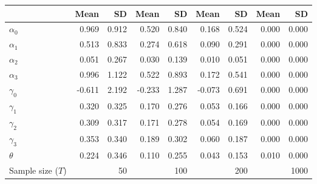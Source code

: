 
\begin{tabular}[t]{lrrrrrrrr}
\toprule
  & Mean & SD & Mean  & SD  & Mean   & SD   & Mean    & SD   \\
\midrule
$\alpha_{0}$ & 0.969 & 0.912 & 0.520 & 0.840 & 0.168 & 0.524 & 0.000 & 0.000\\
$\alpha_{1}$ & 0.513 & 0.833 & 0.274 & 0.618 & 0.090 & 0.291 & 0.000 & 0.000\\
$\alpha_{2}$ & 0.051 & 0.267 & 0.030 & 0.139 & 0.010 & 0.051 & 0.000 & 0.000\\
$\alpha_{3}$ & 0.996 & 1.122 & 0.522 & 0.893 & 0.172 & 0.541 & 0.000 & 0.000\\
$\gamma_{0}$ & -0.611 & 2.192 & -0.233 & 1.287 & -0.073 & 0.691 & 0.000 & 0.000\\
$\gamma_{1}$ & 0.320 & 0.325 & 0.170 & 0.276 & 0.053 & 0.166 & 0.000 & 0.000\\
$\gamma_{2}$ & 0.309 & 0.317 & 0.171 & 0.278 & 0.054 & 0.169 & 0.000 & 0.000\\
$\gamma_{3}$ & 0.353 & 0.340 & 0.189 & 0.302 & 0.060 & 0.187 & 0.000 & 0.000\\
$\theta$ & 0.224 & 0.346 & 0.110 & 0.255 & 0.043 & 0.153 & 0.010 & 0.000\\
Sample size ($T$) &  & 50 &  & 100 &  & 200 &  & 1000\\
\bottomrule
\end{tabular}
